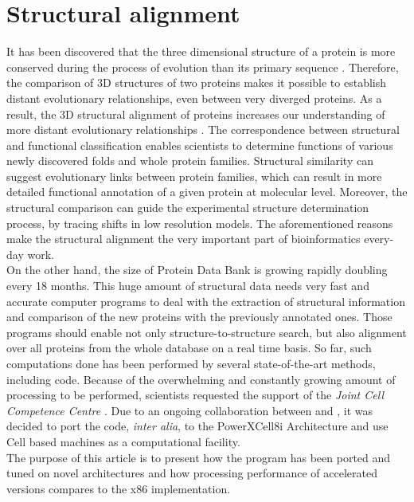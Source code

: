 \section{Structural alignment}
It has been discovered that the three dimensional structure of a protein is more
conserved during the process of evolution than its primary sequence \cite{chle}.
Therefore, the comparison of 3D structures of two proteins makes it possible to
establish distant evolutionary relationships, even between very diverged proteins.
As a result, the 3D structural alignment of proteins increases our understanding of
more distant evolutionary relationships \cite{buj2000,jms}.
The correspondence between structural and functional classification enables
scientists to determine functions of various newly discovered folds and whole
protein families. Structural similarity can suggest evolutionary links between protein
families, which can result in more detailed functional annotation
of a given protein at molecular level.
Moreover, the structural comparison can guide the experimental structure
determination process, by tracing shifts in low resolution
models.
The aforementioned reasons make the structural alignment the 
very important part of bioinformatics every-day work.\\
On the other hand, the size of Protein Data Bank \cite{pdb} 
is growing rapidly doubling every 18 months.
This huge amount of structural data needs very fast and accurate computer programs to deal
with the extraction of structural information and comparison of the new proteins with the previously 
annotated ones.
Those programs should enable not only
structure-to-structure search, but also alignment over all proteins from the
whole database on a real time basis.
So far, such computations done has been performed by several state-of-the-art methods,
including \prog{} code.
Because of the overwhelming and constantly growing 
amount of processing to be performed, scientists requested
the support of the \emph{Joint Cell Competence Centre} \cite{jccc}.
Due to an ongoing collaboration between \icm{} and \ibm{}, it was decided to
port the \prog{} code, \emph{inter alia}, to the PowerXCell8i Architecture and use Cell
based machines as a computational facility.\\
The purpose of this article is to present how the \prog{} program has been
ported and tuned on novel architectures and how processing performance of
accelerated versions compares to the x86 implementation.

